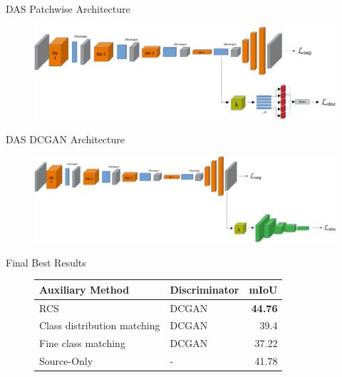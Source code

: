 \documentclass{lib/curtin_format}
\begin{document}
\begin{frame}{DAS Patchwise Architecture}
    \begin{figure}[]
        \centering
        \includegraphics[width=\textwidth]{res/discriminator-diagrams/patch.pdf}
        \label{fig:das-discriminators-patch-wise}
    \end{figure}
\end{frame}

\begin{frame}{DAS DCGAN Architecture}
    \begin{figure}[]
        \centering
        \includegraphics[width=\textwidth]{res/discriminator-diagrams/dcgan-output.pdf}
        \label{fig:das-discriminators-dcgan}
    \end{figure}
\end{frame}

\begin{frame}{Final Best Results}
    \begin{figure}[h]
        \centering
        \begin{tabular}{|l|l|r|}
            \hline
            Auxiliary Method            & Discriminator & \multicolumn{1}{l|}{mIoU} \\ \hline
            RCS                         & DCGAN         & \textbf{44.76}            \\ \hline
            Class distribution matching & DCGAN         & 39.4                      \\ \hline
            Fine class matching         & DCGAN         & 37.22                     \\ \hline
            Source-Only                 & -             & 41.78                     \\ \hline
        \end{tabular}
    \end{figure}
\end{frame}
\end{document}
